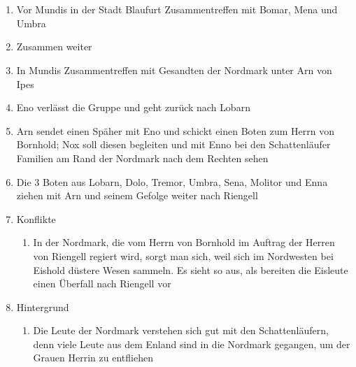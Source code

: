 \documentclass[12pt,a4paper,onecolumn,oneside,ngerman]{book}
\newcommand{\Molitor}{Molitor}
\newcommand{\Sena}{Sena}
\newcommand{\Enland}{Enland}
\newcommand{\Schattenlaufer}{Schattenläufer}
\newcommand{\Eno}{Eno}
\newcommand{\Bomar}{Bomar}
\newcommand{\Dolo}{Dolo}
\newcommand{\Nox}{Nox}
\newcommand{\Mena}{Mena}
\newcommand{\Umbra}{Umbra}
\newcommand{\Enna}{Enna}
\newcommand{\Enno}{Enno}
\newcommand{\Tremor}{Tremor}
\newcommand{\Lobarn}{Lobarn}
\newcommand{\Nordmark}{Nordmark}
\newcommand{\Ipes}{Ipes}
\newcommand{\Bornhold}{Bornhold}
\newcommand{\Eishold}{Eishold}
\newcommand{\Arn}{Arn}
\newcommand{\Eisleute}{Eisleute}
\newcommand{\Rhingell}{Riengell}
\newcommand{\Blaufurt}{Blaufurt}
\newcommand{\Mundis}{Mundis}
\begin{document}
\chapter[Trennung auf Zeit]{}
\begin{enumerate}
  \item Vor {\Mundis} in der Stadt {\Blaufurt} Zusammentreffen mit {\Bomar}, {\Mena} und {\Umbra}
  \item Zusammen weiter
  \item In {\Mundis} Zusammentreffen mit Gesandten der {\Nordmark} unter {\Arn} von {\Ipes}
  \item {\Eno} verlässt die Gruppe und geht zurück nach {\Lobarn}
  \item {\Arn} sendet einen Späher mit {\Eno} und schickt einen Boten zum Herrn von {\Bornhold}; {\Nox} soll diesen begleiten und mit {\Enno} bei den {\Schattenlaufer} Familien am Rand der {\Nordmark} nach dem Rechten sehen
  \item Die 3 Boten aus {\Lobarn}, {\Dolo}, {\Tremor}, {\Umbra}, {\Sena}, {\Molitor} und {\Enna} ziehen mit {\Arn} und seinem Gefolge weiter nach {\Rhingell}
  \item Konflikte
  \begin{enumerate}
    \item In der {\Nordmark}, die vom Herrn von {\Bornhold} im Auftrag der Herren von {\Rhingell} regiert wird, sorgt man sich, weil sich im Nordwesten bei {\Eishold} düstere Wesen sammeln. Es sieht so aus, als bereiten die {\Eisleute} einen Überfall nach {\Rhingell} vor
  \end{enumerate}
  \item Hintergrund
  \begin{enumerate}
    \item Die Leute der {\Nordmark} verstehen sich gut mit den {\Schattenlaufer}n, denn viele Leute aus dem {\Enland} sind in die {\Nordmark} gegangen, um der Grauen Herrin zu entfliehen
  \end{enumerate}
\end{enumerate}
\end{document}
